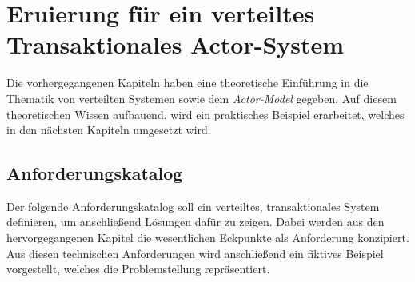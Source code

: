 \chapter{Eruierung für ein verteiltes Transaktionales Actor-System} 
\label{cha:Eruierung}
Die vorhergegangenen Kapiteln haben eine theoretische Einführung in die Thematik von verteilten Systemen sowie dem \textit{Actor-Model} gegeben. Auf diesem theoretischen Wissen aufbauend, wird ein praktisches Beispiel erarbeitet, welches in den nächsten Kapiteln umgesetzt wird. 

\section{Anforderungskatalog} \label{sec:Eruierung:technicalRequierements}
Der folgende Anforderungskatalog soll ein verteiltes, transaktionales System definieren, um anschließend Lösungen dafür zu zeigen. Dabei werden aus den hervorgegangenen Kapitel die wesentlichen Eckpunkte als Anforderung konzipiert. Aus diesen technischen Anforderungen wird anschließend ein fiktives Beispiel vorgestellt, welches die Problemstellung repräsentiert.

